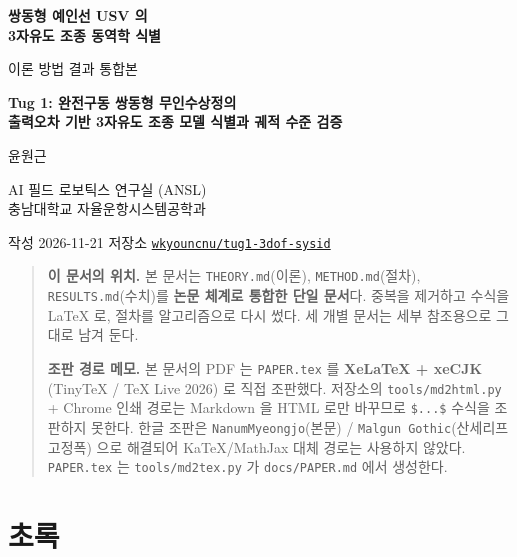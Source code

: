 \documentclass[10pt,a4paper]{article}
\begin{document}
\begin{center}
{\LARGE\bfseries 쌍동형 예인선 USV 의\\[2pt]
3자유도 조종 동역학 식별\par}
\vspace{6pt}
{\large 이론 \textperiodcentered{} 방법 \textperiodcentered{} 결과 통합본\par}
\vspace{14pt}
{\normalsize\bfseries Tug 1: 완전구동 쌍동형 무인수상정의\\[2pt]
출력오차 기반 3자유도 조종 모델 식별과 궤적 수준 검증\par}
\vspace{16pt}
{\normalsize 윤원근\par}
{\small AI 필드 로보틱스 연구실 (ANSL)\\
충남대학교 자율운항시스템공학과\par}
\vspace{10pt}
{\small 작성 2026-11-21 \textperiodcentered{} 저장소
\href{https://github.com/wkyouncnu/tug1-3dof-sysid}{\texttt{wkyouncnu/tug1-3dof-sysid}}\par}
\end{center}

\vspace{4pt}

\begin{quote}\small
\textbf{이 문서의 위치.} 본 문서는 \texttt{THEORY.md}(이론), \texttt{METHOD.md}(절차),
\texttt{RESULTS.md}(수치)를 \textbf{논문 체계로 통합한 단일 문서}다. 중복을 제거하고
수식을 LaTeX 로, 절차를 알고리즘으로 다시 썼다. 세 개별 문서는 세부 참조용으로 그대로 남겨 둔다.

\textbf{조판 경로 메모.} 본 문서의 PDF 는 \texttt{PAPER.tex} 를 \textbf{XeLaTeX + xeCJK}
(TinyTeX / TeX Live 2026) 로 직접 조판했다. 저장소의 \texttt{tools/md2html.py} + Chrome 인쇄
경로는 Markdown 을 HTML 로만 바꾸므로 \texttt{\$...\$} 수식을 조판하지 못한다. 한글 조판은
\texttt{NanumMyeongjo}(본문) / \texttt{Malgun Gothic}(산세리프 \textperiodcentered{} 고정폭)
으로 해결되어 KaTeX/MathJax 대체 경로는 사용하지 않았다. \texttt{PAPER.tex} 는
\texttt{tools/md2tex.py} 가 \texttt{docs/PAPER.md} 에서 생성한다.
\end{quote}

\vspace{6pt}
{\small\tableofcontents}
\clearpage
{}
\section*{초록}
\end{document}
